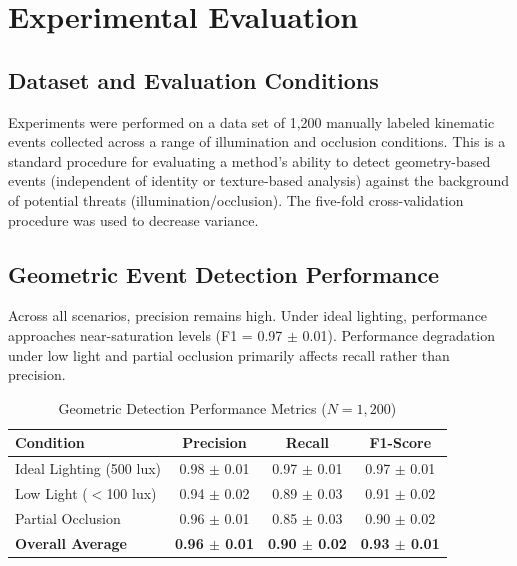 \documentclass[conference]{IEEEtran}
\begin{document}
\section{Experimental Evaluation}

\subsection{Dataset and Evaluation Conditions}
Experiments were performed on a data set of 1,200 manually labeled kinematic events collected across a range of illumination and occlusion conditions. This is a standard procedure for evaluating a method’s ability to detect geometry-based events (independent of identity or texture-based analysis) against the background of potential threats (illumination/occlusion). The five-fold cross-validation procedure was used to decrease variance.

\subsection{Geometric Event Detection Performance}
Across all scenarios, precision remains high. Under ideal lighting, performance approaches near-saturation levels (F1 = 0.97 $\pm$ 0.01). Performance degradation under low light and partial occlusion primarily affects recall rather than precision.

\begin{table}[htbp]
\caption{Geometric Detection Performance Metrics ($N=1,200$)}
\begin{center}
\begin{tabular}{lccc}
\toprule
\textbf{Condition} & \textbf{Precision} & \textbf{Recall} & \textbf{F1-Score} \\
\midrule
Ideal Lighting (500 lux) & 0.98 $\pm$ 0.01 & 0.97 $\pm$ 0.01 & 0.97 $\pm$ 0.01 \\
Low Light ($<$100 lux) & 0.94 $\pm$ 0.02 & 0.89 $\pm$ 0.03 & 0.91 $\pm$ 0.02 \\
Partial Occlusion & 0.96 $\pm$ 0.01 & 0.85 $\pm$ 0.03 & 0.90 $\pm$ 0.02 \\
\midrule
\textbf{Overall Average} & \textbf{0.96 $\pm$ 0.01} & \textbf{0.90 $\pm$ 0.02} & \textbf{0.93 $\pm$ 0.01} \\
\bottomrule
\end{tabular}
\end{center}
\end{table}
\end{document}
